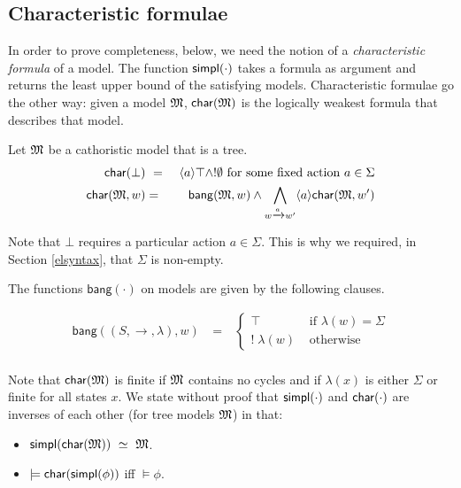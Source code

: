 \subsection{Characteristic formulae}

In order to prove completeness, below, we need the notion of a
\emph{characteristic formula} of a model.  The function
$\mathsf{simpl}(\cdot)$ takes a formula as argument and returns
the least upper bound of the satisfying models. Characteristic formulae go the other way: given a model
$\frak{M}$, $\mathsf{char}(\frak{M})$ is the logically weakest formula that describes that model. 
\clearpage

\clearpage

\begin{definition}
Let $\frak{M}$ be a cathoristic model that is a tree.
\begin{eqnarray*}
  \mathsf{char}(\bot) &\ =\ & \langle a \rangle \top \land ! \emptyset  \mbox{ for some fixed action }a \in \Sigma  \\
  \mathsf{char}(\frak{M}, w) & = & \mathsf{bang}(\frak{M},w) \land \bigwedge_{w \xrightarrow{a} w'} \langle a \rangle \mathsf{char}(\frak{M}, w')  
\end{eqnarray*}

\end{definition}

\NI Note that $\bot$ requires a particular action $a \in \Sigma$. This
is why we required, in Section \ref{elsyntax}, that $\Sigma$ is
non-empty.

The functions $\mathsf{bang}(\cdot)$ on models are given by the
following clauses.

\begin{eqnarray*}
  \mathsf{bang}((S,\rightarrow,\lambda),w) 
     & \ = \ & 
  \begin{cases}
    \top & \mbox{ if } \lambda(w) = \Sigma  \\
    ! \; \lambda(w) & \mbox{ otherwise }  
  \end{cases} \\
\end{eqnarray*}

\NI Note that $\mathsf{char}(\frak{M})$ is finite if $\frak{M}$ contains no cycles and
if $\lambda(x)$ is either $\Sigma$ or finite for all states $x$.  We
state without proof that $\mathsf{simpl}(\cdot)$ and $\mathsf{char}(\cdot)$ are
inverses of each other (for tree models $\frak{M}$) in that:

\begin{itemize}

\item $\mathsf{simpl}(\mathsf{char}(\frak{M})) \ \simeq \  \frak{M}$. 

\item $\models \mathsf{char}(\mathsf{simpl}(\phi))$ iff $\models\phi$.

\end{itemize}


